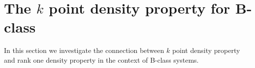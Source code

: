 \documentclass[12pt,oneside,a4paper]{amsart}
\begin{document}



    \bigskip
    \section{The \texorpdfstring{$k$}{k} point density property for B-class}
      \label{sec:kpd}
      In this section we investigate the connection between $k$ point density property and
        rank one density property in the context of B-class systems.
\end{document}
